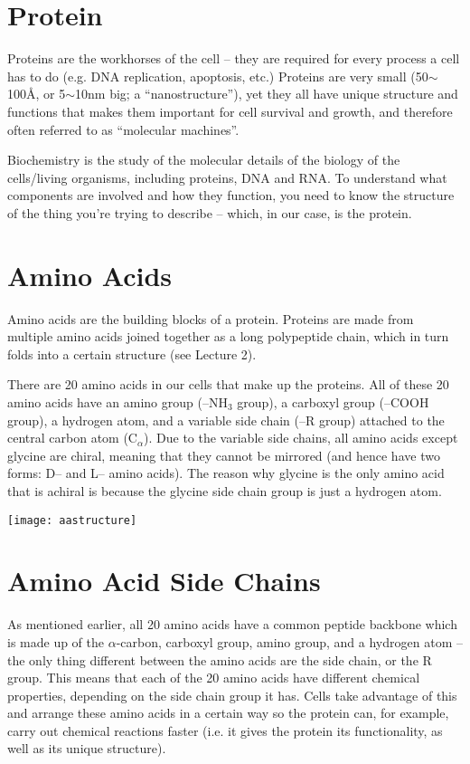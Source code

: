 \section{Protein}

Proteins are the workhorses of the cell -- they are required for every process a cell has to do (e.g. DNA replication, apoptosis, etc.)
Proteins are very small (50$\sim$100\AA{}, or 5$\sim$10nm big; a ``nanostructure''), yet they all have unique structure and functions that makes them important for cell survival and growth, and therefore often referred to as ``molecular machines''.

Biochemistry is the study of the molecular details of the biology of the cells/living organisms, including proteins, DNA and RNA.
To understand what components are involved and how they function, you need to know the structure of the thing you're trying to describe -- which, in our case, is the protein.

\section{Amino Acids}

Amino acids are the building blocks of a protein.
Proteins are made from multiple amino acids joined together as a long polypeptide chain, which in turn folds into a certain structure (see Lecture 2).

There are 20 amino acids in our cells that make up the proteins.
All of these 20 amino acids have an amino group (--NH$_3$ group), a carboxyl group (--COOH group), a hydrogen atom, and a variable side chain (--R group) attached to the central carbon atom (C$_{\alpha}$).
Due to the variable side chains, all amino acids except glycine are chiral, meaning that they cannot be mirrored (and hence have two forms: D-- and L-- amino acids).
The reason why glycine is the only amino acid that is achiral is because the glycine side chain group is just a hydrogen atom.

\texttt{[image: aastructure]}

\section{Amino Acid Side Chains}

As mentioned earlier, all 20 amino acids have a common peptide backbone which is made up of the $\alpha$-carbon, carboxyl group, amino group, and a hydrogen atom -- the only thing different between the amino acids are the side chain, or the R group.
This means that each of the 20 amino acids have different chemical properties, depending on the side chain group it has.
Cells take advantage of this and arrange these amino acids in a certain way so the protein can, for example, carry out chemical reactions faster (i.e. it gives the protein its functionality, as well as its unique structure).

